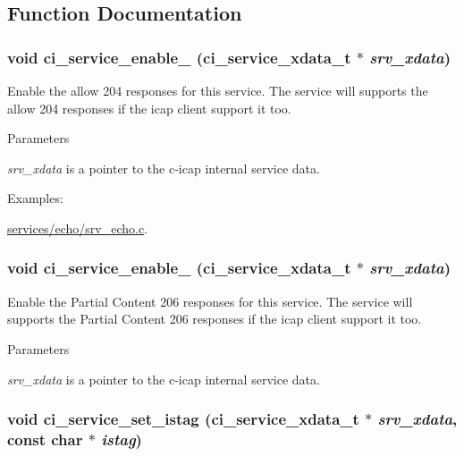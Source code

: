 \subsection{Function Documentation}
\hypertarget{group__SERVICES_gafbb687c7869176c56b9217a61f400a9c}{
\subsubsection[{ci\_\-service\_\-enable\_\-204}]{\setlength{\rightskip}{0pt plus 5cm}void ci\_\-service\_\-enable\_ ({\bf ci\_\-service\_\-xdata\_\-t} $\ast$ {\em srv\_\-xdata})}}
\label{group__SERVICES_gafbb687c7869176c56b9217a61f400a9c}


Enable the allow 204 responses for this service. The service will supports the allow 204 responses if the icap client support it too. 
\begin{DoxyParams}{Parameters}
\item[{\em srv\_\-xdata}]is a pointer to the c-\/icap internal service data. \end{DoxyParams}
\begin{Desc}
\item[Examples: ]\par
\hyperlink{services_2echo_2srv__echo_8c-example}{services/echo/srv\_\-echo.c}.\end{Desc}
\hypertarget{group__SERVICES_gac2b4f2ae3dfdf1718b5a7ce5418a8e62}{
\subsubsection[{ci\_\-service\_\-enable\_\-206}]{\setlength{\rightskip}{0pt plus 5cm}void ci\_\-service\_\-enable\_ ({\bf ci\_\-service\_\-xdata\_\-t} $\ast$ {\em srv\_\-xdata})}}
\label{group__SERVICES_gac2b4f2ae3dfdf1718b5a7ce5418a8e62}


Enable the Partial Content 206 responses for this service. The service will supports the Partial Content 206 responses if the icap client support it too. 
\begin{DoxyParams}{Parameters}
\item[{\em srv\_\-xdata}]is a pointer to the c-\/icap internal service data. \end{DoxyParams}
\hypertarget{group__SERVICES_ga63811072507e9b7b78c841f1c9632ee1}{
\subsubsection[{ci\_\-service\_\-set\_\-istag}]{\setlength{\rightskip}{0pt plus 5cm}void ci\_\-service\_\-set\_\-istag ({\bf ci\_\-service\_\-xdata\_\-t} $\ast$ {\em srv\_\-xdata}, \/  const char $\ast$ {\em istag})}}
\label{group__SERVICES_ga63811072507e9b7b78c841f1c9632ee1}


